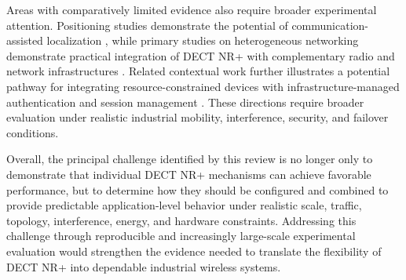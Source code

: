 Areas with comparatively limited evidence also require broader experimental
attention. Positioning studies demonstrate the potential of
communication-assisted localization
\cite{saikkoPositioningDECT2020NR2024,
saikkoPositioningTrackingDECT20202025}, while primary studies on heterogeneous
networking demonstrate practical integration of DECT NR+ with complementary
radio and network infrastructures
\cite{dangEWDCIntegratingDECT20202025a,
dangUniRATUnifiedDECT20202026}. Related contextual work further illustrates a
potential pathway for integrating resource-constrained devices with
infrastructure-managed authentication and session management
\cite{ngoIoTDeviceAuthentication2025}. These directions require broader
evaluation under realistic industrial mobility, interference, security, and
failover conditions.

Overall, the principal challenge identified by this review is no longer only
to demonstrate that individual DECT NR+ mechanisms can achieve favorable
performance, but to determine how they should be configured and combined to
provide predictable application-level behavior under realistic scale, traffic,
topology, interference, energy, and hardware constraints. Addressing this
challenge through reproducible and increasingly large-scale experimental
evaluation would strengthen the evidence needed to translate the flexibility
of DECT NR+ into dependable industrial wireless systems.